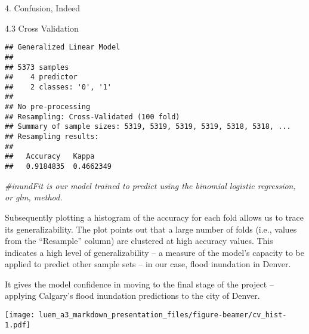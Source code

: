 \documentclass[
  ignorenonframetext,
]{beamer}
\newenvironment{Shaded}{\begin{snugshade}}{\end{snugshade}}
\newcommand{\AttributeTok}[1]{\textcolor[rgb]{0.77,0.63,0.00}{#1}}
\newcommand{\CommentTok}[1]{\textcolor[rgb]{0.56,0.35,0.01}{\textit{#1}}}
\newcommand{\DecValTok}[1]{\textcolor[rgb]{0.00,0.00,0.81}{#1}}
\newcommand{\FunctionTok}[1]{\textcolor[rgb]{0.00,0.00,0.00}{#1}}
\newcommand{\NormalTok}[1]{#1}
\newcommand{\SpecialCharTok}[1]{\textcolor[rgb]{0.00,0.00,0.00}{#1}}
\newcommand{\StringTok}[1]{\textcolor[rgb]{0.31,0.60,0.02}{#1}}
\begin{document}
\begin{frame}[fragile]{4. Confusion, Indeed}
\begin{block}{4.3 Cross Validation}
\begin{verbatim}
## Generalized Linear Model 
## 
## 5373 samples
##    4 predictor
##    2 classes: '0', '1' 
## 
## No pre-processing
## Resampling: Cross-Validated (100 fold) 
## Summary of sample sizes: 5319, 5319, 5319, 5319, 5318, 5318, ... 
## Resampling results:
## 
##   Accuracy   Kappa    
##   0.9184835  0.4662349
\end{verbatim}

\begin{Shaded}
\begin{Highlighting}[]
\CommentTok{\#inundFit is our model trained to predict using the binomial logistic regression, or glm, method. }
\end{Highlighting}
\end{Shaded}

Subsequently plotting a histogram of the accuracy for each fold allows
us to trace its generalizability. The plot points out that a large
number of folds (i.e., values from the ``Resample'' column) are
clustered at high accuracy values. This indicates a high level of
generalizability -- a measure of the model's capacity to be applied to
predict other sample sets -- in our case, flood inundation in Denver.

It gives the model confidence in moving to the final stage of the
project -- applying Calgary's flood inundation predictions to the city
of Denver.

\begin{Shaded}
\end{Shaded}

\texttt{[image: luem\_a3\_markdown\_presentation\_files/figure-beamer/cv\_hist-1.pdf]}
\end{block}
\end{frame}
\end{document}

